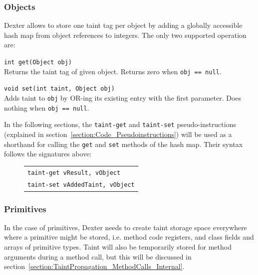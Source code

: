 \documentclass[12pt,twoside,notitlepage]{report}
\newcommand{\centerbox}[1] {
	\begin{center}
	\begin{footnotesize}
	\begin{tabular}{l}
		#1
	\end{tabular}
	\end{footnotesize}
	\end{center}
}
\newcommand{\asm}[1] {\texttt{#1}}
\begin{document}
\subsubsection{Objects}
\label{section:TaintTagStorage_Objects}

Dexter allows to store one taint tag per object by adding a globally accessible hash map from object references to integers. The only two supported operation are:
\begin{description} 
\item \verb$int get(Object obj)$ \\
Returns the taint tag of given object. Returns zero when \verb$obj == null$.
\item \verb$void set(int taint, Object obj)$ \\
Adds taint to \verb$obj$ by OR-ing its existing entry with the first parameter. Does nothing when \verb$obj == null$.
\end{description}

In the following sections, the \verb$taint-get$ and \verb$taint-set$ pseudo-instructions (explained in section~\ref{section:Code_Pseudoinstructions}) will be used as a shorthand for calling the \verb$get$ and \verb$set$ methods of the hash map. Their syntax follows the signatures above:

	\begin{figure}[H]
		\centerbox{
			\asm{taint-get vResult, vObject} \\
			\asm{taint-set vAddedTaint, vObject}
		}
	\end{figure}

\subsubsection{Primitives}

\label{section:TaintStorage_Primitives}

In the case of primitives, Dexter needs to create taint storage space everywhere where a primitive might be stored, i.e. method code registers, and class fields and arrays of primitive types. Taint will also be temporarily stored for method arguments during a method call, but this will be discussed in section~\ref{section:TaintPropagation_MethodCalls_Internal}.
\end{document}
